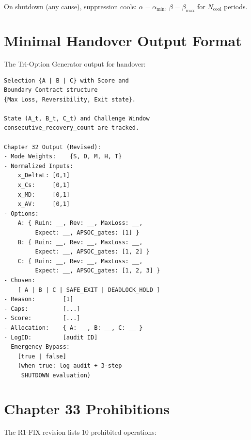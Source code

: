 On shutdown (any cause), suppression cools:
$\alpha = \alpha_{\min}$, $\beta = \beta_{\max}$ for
$N_{\mathrm{cool}}$ periods.

\section{Minimal Handover Output Format}
\label{sec:r1fix-handover}

The Tri-Option Generator output for handover:

\begin{lstlisting}[basicstyle=\ttfamily\scriptsize,frame=single]
Selection {A | B | C} with Score and
Boundary Contract structure
{Max Loss, Reversibility, Exit state}.

State (A_t, B_t, C_t) and Challenge Window
consecutive_recovery_count are tracked.

Chapter 32 Output (Revised):
- Mode Weights:    {S, D, M, H, T}
- Normalized Inputs:
    x_DeltaL: [0,1]
    x_Cs:     [0,1]
    x_MD:     [0,1]
    x_AV:     [0,1]
- Options:
    A: { Ruin: __, Rev: __, MaxLoss: __,
         Expect: __, APSOC_gates: [1] }
    B: { Ruin: __, Rev: __, MaxLoss: __,
         Expect: __, APSOC_gates: [1, 2] }
    C: { Ruin: __, Rev: __, MaxLoss: __,
         Expect: __, APSOC_gates: [1, 2, 3] }
- Chosen:
    [ A | B | C | SAFE_EXIT | DEADLOCK_HOLD ]
- Reason:        [1]
- Caps:          [...]
- Score:         [...]
- Allocation:    { A: __, B: __, C: __ }
- LogID:         [audit ID]
- Emergency Bypass:
    [true | false]
    (when true: log audit + 3-step
     SHUTDOWN evaluation)
\end{lstlisting}

\section{Chapter 33 Prohibitions}
\label{sec:r1fix-prohibitions}

The R1-FIX revision lists 10 prohibited operations:

